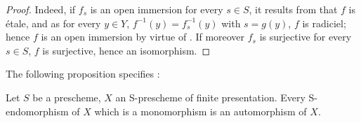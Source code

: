 \begin{proof}
Indeed, if $f_s$ is an open immersion for every $s\in S$, it results from  that $f$ is \'etale, and as for every $y\in Y$, $f^{-1}(y)=f_s^{-1}(y)$ with $s=g(y)$, $f$ is radiciel; hence $f$ is an open immersion by virtue of .
If moreover $f_s$ is surjective for every $s\in S$, $f$ is surjective, hence an isomorphism.
\end{proof}

The following proposition specifies :
\begin{proposition}[17.9.6]
\label{IV.17.9.6}
Let $S$ be a prescheme, $X$ an S-prescheme of finite presentation.
Every S-endomorphism of $X$ which is a monomorphism is an automorphism of $X$.
\end{proposition}

